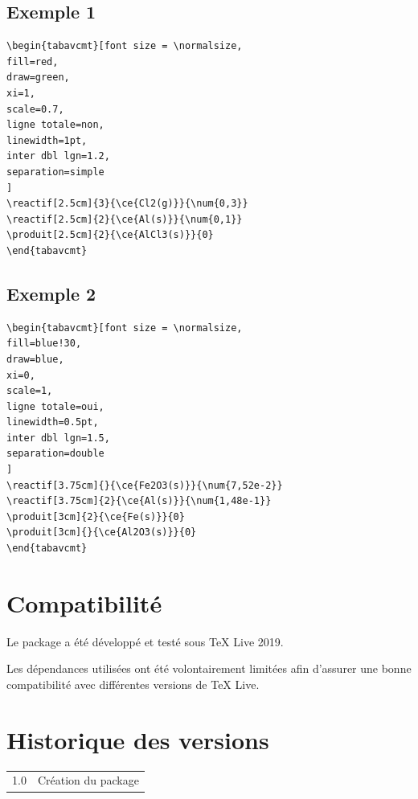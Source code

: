\documentclass[a4paper,11pt]{article}
\begin{document}
\subsection{Exemple 1}
\begin{verbatim}
\begin{tabavcmt}[font size = \normalsize,
fill=red,
draw=green,
xi=1,
scale=0.7,
ligne totale=non,
linewidth=1pt,
inter dbl lgn=1.2,
separation=simple
]
\reactif[2.5cm]{3}{\ce{Cl2(g)}}{\num{0,3}}
\reactif[2.5cm]{2}{\ce{Al(s)}}{\num{0,1}}
\produit[2.5cm]{2}{\ce{AlCl3(s)}}{0}
\end{tabavcmt}
\end{verbatim}

\begin{tabavcmt}[font size = \normalsize,
fill=red,
draw=green,
xi=0,
scale=0.9,
ligne totale=non,
linewidth=1pt,
inter dbl lgn=1.2,
separation=simple
]
\end{tabavcmt}

\newpage
\subsection{Exemple 2}
\begin{verbatim}
\begin{tabavcmt}[font size = \normalsize,
fill=blue!30,
draw=blue,
xi=0,
scale=1,
ligne totale=oui,
linewidth=0.5pt,
inter dbl lgn=1.5,
separation=double
]
\reactif[3.75cm]{}{\ce{Fe2O3(s)}}{\num{7,52e-2}}
\reactif[3.75cm]{2}{\ce{Al(s)}}{\num{1,48e-1}}
\produit[3cm]{2}{\ce{Fe(s)}}{0}
\produit[3cm]{}{\ce{Al2O3(s)}}{0}
\end{tabavcmt}
\end{verbatim}

\begin{tabavcmt}[font size = \normalsize,
fill=blue!30,
draw=blue,
xi=1,
scale=1,
ligne totale=oui,
linewidth=0.5pt,
inter dbl lgn=1.5,
separation=double
]
\end{tabavcmt}

\section{Compatibilité}

Le package a été développé et testé sous TeX Live 2019.

Les dépendances utilisées ont été volontairement limitées afin d'assurer une bonne compatibilité avec différentes versions de TeX Live.

\section{Historique des versions}

\begin{tabular}{ll}
1.0 & Création du package \\
\end{tabular}
\end{document}
